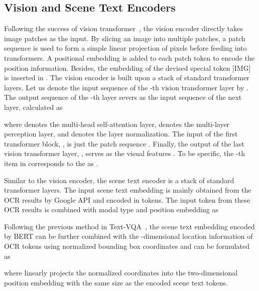 \documentclass[10pt,twocolumn,letterpaper]{article}
\begin{document}
\noindent\subsection{Vision and Scene Text Encoders}
\label{Vision Encoder}
Following the success of vision transformer~\cite{ViT}, the vision encoder directly takes image patches as the input. By slicing an image into multiple patches, a patch sequence  is used to form a simple linear projection of pixels before  feeding into transformers. A positional embedding is added to each patch token to encode the position information. Besides, the embedding of the devised special token \textup{[IMG]} is inserted in . The vision encoder is built upon a stack of  standard transformer layers. Let us denote the input sequence of the -th vision transformer layer by . The output sequence of the -th layer severs as the input sequence of the next layer, calculated as

where  denotes the multi-head self-attention layer,   denotes the multi-layer perception layer, and  denotes the layer normalization. The input of the first transformer block, , is just the patch sequence .  Finally, the output of the last vision transformer layer, , serves as the visual features . 
To be specific, the -th item in  corresponds to the  as .









Similar to the vision encoder, the scene text encoder is a stack of  standard transformer layers. The input scene text embedding is mainly obtained from the OCR results by Google API \cite{Google_api} and encoded in tokens. The input token from these OCR results is combined with modal type  and position embedding  as

Following the previous method in Text-VQA~\cite{M4C}, the scene text embedding encoded by BERT \cite{BERT} can be further combined with the -dimensional location information of OCR tokens using normalized bounding box coordinates  and can be formulated as\vspace{-0.5em}

where  linearly projects the normalized coordinates into the two-dimensional position embedding with the same size as the encoded scene text tokens. 
\end{document}
